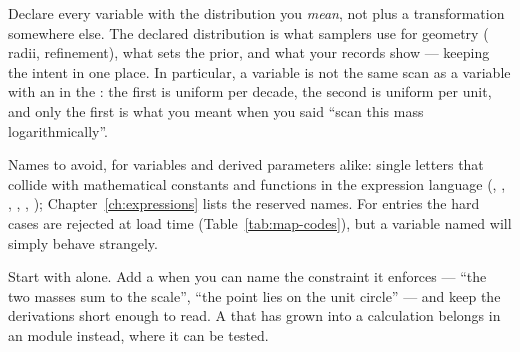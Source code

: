 \begin{jtip}
Declare every variable with the distribution you \emph{mean}, not  plus a
transformation somewhere else. The declared distribution is what samplers use for
geometry ( radii,  refinement), what sets the
prior, and what your records show --- keeping the intent in one place. In particular, a
 variable is not the same scan as a  variable with an
 in the : the first is uniform per decade, the second is
uniform per unit, and only the first is what you meant when you said ``scan this mass
logarithmically''.
\end{jtip}

Names to avoid, for variables and derived parameters alike: single letters that collide
with mathematical constants and functions in the expression language (,
, , , , ); Chapter~\ref{ch:expressions}
lists the reserved names. For  entries the hard cases are rejected at
load time (Table~\ref{tab:map-codes}), but a variable named  will simply
behave strangely.

\begin{jtip}
Start with  alone. Add a  when you can name the
constraint it enforces --- ``the two masses sum to the scale'', ``the point lies on the
unit circle'' --- and keep the derivations short enough to read. A  that
has grown into a calculation belongs in an  module instead, where it can
be tested.
\end{jtip}
